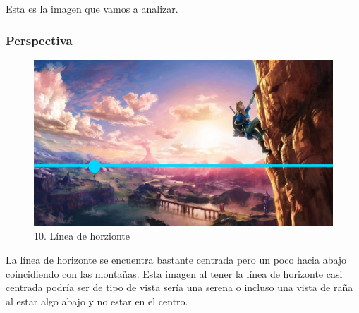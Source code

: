 \documentclass[12pt]{article}
\begin{document}
    Esta es la imagen que vamos a analizar.
    \subsubsection{Perspectiva}
    \begin{figure}[H]
      \centering
      \includegraphics[width=\textwidth]{images/Selena/10 linia de horizonte.jpg}
      \caption{\small 10. Línea de horzionte}
    \end{figure}
    La línea de horizonte se encuentra bastante centrada pero un poco hacia abajo coincidiendo con las montañas. Esta imagen al tener la línea de horizonte casi centrada podría ser de tipo de vista sería una serena o incluso una vista de raña al estar algo abajo y no estar en el centro. 

    
\end{document}

